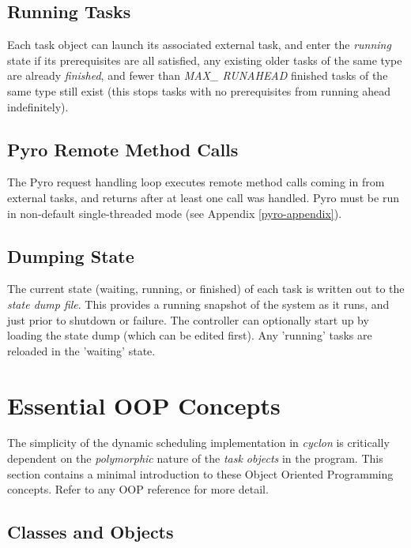 \documentclass[11pt,a4paper]{article}
\begin{document}
\subsection{Running Tasks}

Each task object can launch its associated external task, and enter the
{\em running} state if its prerequisites are all satisfied, any existing
older tasks of the same type are already {\em finished}, and fewer than
{\em MAX\_ RUNAHEAD} finished tasks of the same type still exist (this
stops tasks with no prerequisites from running ahead indefinitely).

\subsection{Pyro Remote Method Calls}

The Pyro request handling loop executes remote method calls coming in
from external tasks, and returns after at least one call was handled.
Pyro must be run in non-default single-threaded mode (see Appendix
\ref{pyro-appendix}).

\subsection{Dumping State} 

The current state (waiting, running, or finished) of each task is
written out to the {\em state dump file}.  This provides a running
snapshot of the system as it runs, and just prior to shutdown or
failure. The controller can optionally start up by loading the state
dump (which can be edited first). Any 'running' tasks are reloaded in
the 'waiting' state.

\appendix

\section{Essential OOP Concepts}

The simplicity of the dynamic scheduling implementation in {\em cyclon}
is critically dependent on the {\em polymorphic} nature of the {\em task
objects} in the program.  This section contains a minimal introduction
to these Object Oriented Programming concepts.  Refer to any OOP
reference for more detail.

\subsection{Classes and Objects}
\end{document}
